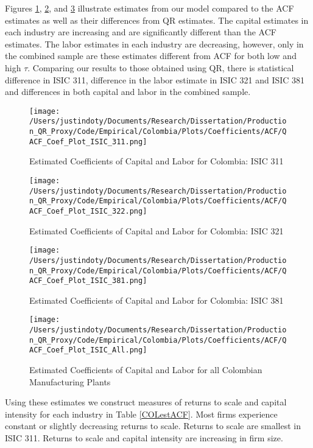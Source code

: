 \documentclass[11pt]{article}
\begin{document}
Figures \ref{fig:ACFCOL311}, \ref{fig:ACFCOL321}, and \ref{fig:ACFCOL381} illustrate estimates from our model compared to the ACF estimates as well as their differences from QR estimates. The capital estimates in each industry are increasing and are significantly different than the ACF estimates. The labor estimates in each industry are decreasing, however, only in the combined sample are these estimates different from ACF for both low and high $\tau$. Comparing our results to those obtained using QR, there is statistical difference in ISIC 311, difference in the labor estimate in ISIC 321 and ISIC 381 and differences in both capital and labor in the combined sample.

\begin{figure}[H]
\centering
\caption{Estimated Coefficients of Capital and Labor for Colombia: ISIC 311}
\texttt{[image: /Users/justindoty/Documents/Research/Dissertation/Production\_QR\_Proxy/Code/Empirical/Colombia/Plots/Coefficients/ACF/QACF\_Coef\_Plot\_ISIC\_311.png]}
\label{fig:ACFCOL311}
\end{figure}

\begin{figure}[H]
\centering
\caption{Estimated Coefficients of Capital and Labor for Colombia: ISIC 321}
\texttt{[image: /Users/justindoty/Documents/Research/Dissertation/Production\_QR\_Proxy/Code/Empirical/Colombia/Plots/Coefficients/ACF/QACF\_Coef\_Plot\_ISIC\_322.png]}
\label{fig:ACFCOL321}
\end{figure}

\begin{figure}[H]
\centering
\caption{Estimated Coefficients of Capital and Labor for Colombia: ISIC 381}
\texttt{[image: /Users/justindoty/Documents/Research/Dissertation/Production\_QR\_Proxy/Code/Empirical/Colombia/Plots/Coefficients/ACF/QACF\_Coef\_Plot\_ISIC\_381.png]}
\label{fig:ACFCOL381}
\end{figure}

\begin{figure}[H]
\centering
\caption{Estimated Coefficients of Capital and Labor for all Colombian Manufacturing Plants}
\texttt{[image: /Users/justindoty/Documents/Research/Dissertation/Production\_QR\_Proxy/Code/Empirical/Colombia/Plots/Coefficients/ACF/QACF\_Coef\_Plot\_ISIC\_All.png]}
\label{fig:ACFCOLall}
\end{figure}

Using these estimates we construct measures of returns to scale and capital intensity for each industry in Table \ref{COLestACF}. Most firms experience constant or slightly decreasing returns to scale. Returns to scale are smallest in ISIC 311. Returns to scale and capital intensity are increasing in firm size.
\end{document}
